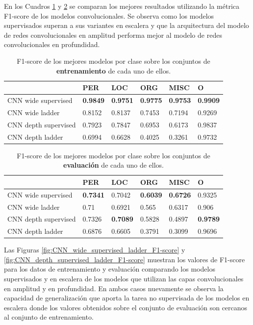 En los Cuadros \ref{table:best_train_CNN_results_table} y \ref{table:best_test_CNN_results_table} se comparan los mejores resultados utilizando la métrica F1-score de los modelos convolucionales. Se observa como los modelos supervisados superan a sus variantes en escalera y que la arquitectura del modelo de redes convolucionales en amplitud performa mejor al modelo de redes convolucionales en profundidad.

\begin{table}[H]
\begin{tabular}{|l|l|l|l|l|l|}
\hline
                    & PER    & LOC    & ORG    & MISC   & O      \\ \hline
CNN wide supervised & \textbf{0.9849} & \textbf{0.9751} & \textbf{0.9775} & \textbf{0.9753} & \textbf{0.9909} \\ \hline
CNN wide ladder     & 0.8152   & 0.8137 & 0.7453  & 0.7194 & 0.9269  \\ \hline
CNN depth supervised & 0.7923 & 0.7847 & 0.6953 & 0.6173 & 0.9837 \\ \hline
CNN depth ladder    & 0.6994 & 0.6628 & 0.4025 & 0.3261 & 0.9732 \\ \hline
\end{tabular}
\caption{F1-score de los mejores modelos por clase sobre los conjuntos de \textbf{entrenamiento} de cada uno de ellos.}
\label{table:best_train_CNN_results_table}
\end{table}


\begin{table}[H]
\begin{tabular}{|l|l|l|l|l|l|}
\hline
                    & PER    & LOC    & ORG    & MISC   & O      \\ \hline
CNN wide supervised & \textbf{0.7341} & 0.7042 & \textbf{0.6039} & \textbf{0.6726} & 0.9325 \\ \hline
CNN wide ladder     & 0.71   & 0.6921 & 0.565  & 0.6317 & 0.906  \\ \hline
CNN depth supervised & 0.7326 & \textbf{0.7089} & 0.5828 & 0.4897 & \textbf{0.9789} \\ \hline
CNN depth ladder    & 0.6876 & 0.6605 & 0.3791 & 0.3099 & 0.9696 \\ \hline
\end{tabular}
\caption{F1-score de los mejores modelos por clase sobre los conjuntos de \textbf{evaluación} de cada uno de ellos.}
\label{table:best_test_CNN_results_table}
\end{table}

Las Figuras \ref{fig:CNN_wide_supervised_ladder_F1-score} y \ref{fig:CNN_depth_supervised_ladder_F1-score} muestran los valores de F1-score para los datos de entrenamiento y evaluación comparando los modelos supervisados y en escalera de los modelos que utilizan las capas convolucionales en amplitud y en profundidad. En ambos casos nuevamente se observa la capacidad de generalización que aporta la tarea no supervisada de los modelos en escalera donde los valores obtenidos sobre el conjunto de evaluación son cercanos al conjunto de entrenamiento.

